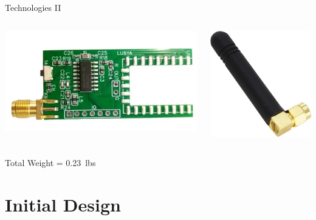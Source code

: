 \documentclass{beamer}
\begin{document}
    \begin{frame}{Technologies II}
    \begin{columns}
        \begin{column}{0.5\textwidth}
            \centering
            \includegraphics[width=.782\textwidth]{figures/market research/RadioReciever.png} %
            \vspace{0.5em} %
        \end{column}

        \begin{column}{0.5\textwidth}
            \centering
            \includegraphics[width=.39\textwidth]{figures/market research/DroneDetectorAntenna.jpg} %
            \vspace{0.5em} %
        \end{column}
    \end{columns}
    \centering
    \vspace{0.5em}
    Total Weight = \qty{0.23}{lbs}
    \end{frame}

    \section{Initial Design}
\end{document}

